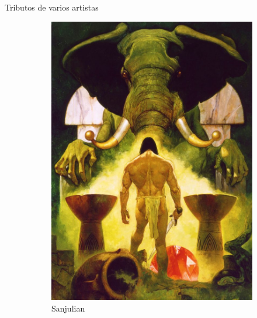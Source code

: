 \begin{frame}{Tributos de varios artistas}
\begin{figure}[htp]
\begin{subfigure}[b]{0.22\textwidth}
   \includegraphics[width=\textwidth]{img/tributos/elephant03}
   \caption{Sanjulian}
 \end{subfigure}
~
 \begin{subfigure}[b]{0.22\textwidth}

\end{subfigure}
\end{figure}
\end{frame}
